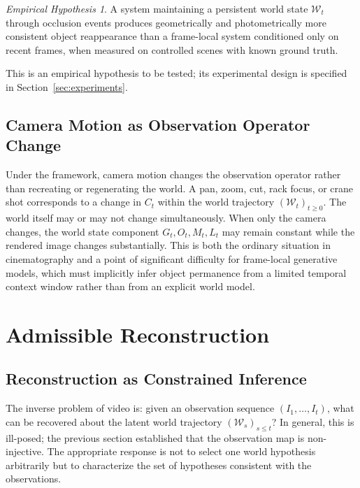 \documentclass[11pt,a4paper]{article}
\theoremstyle{plain}
\theoremstyle{definition}
\theoremstyle{remark}
\newtheorem{hypothesis}[theorem]{Empirical Hypothesis}
\begin{document}
\begin{hypothesis}
\label{hyp:occlusion}
A system maintaining a persistent world state $\mathcal{W}_t$ through occlusion events produces geometrically and photometrically more consistent object reappearance than a frame-local system conditioned only on recent frames, when measured on controlled scenes with known ground truth.
\end{hypothesis}

This is an empirical hypothesis to be tested; its experimental design is specified in Section~\ref{sec:experiments}.

\subsection{Camera Motion as Observation Operator Change}

Under the framework, camera motion changes the observation operator rather than recreating or regenerating the world. A pan, zoom, cut, rack focus, or crane shot corresponds to a change in $C_t$ within the world trajectory $(\mathcal{W}_t)_{t \geq 0}$. The world itself may or may not change simultaneously. When only the camera changes, the world state component $G_t, O_t, M_t, L_t$ may remain constant while the rendered image changes substantially. This is both the ordinary situation in cinematography and a point of significant difficulty for frame-local generative models, which must implicitly infer object permanence from a limited temporal context window rather than from an explicit world model.

\section{Admissible Reconstruction}
\label{sec:admissible}

\subsection{Reconstruction as Constrained Inference}

The inverse problem of video is: given an observation sequence $(I_1, \ldots, I_t)$, what can be recovered about the latent world trajectory $(\mathcal{W}_s)_{s \leq t}$? In general, this is ill-posed; the previous section established that the observation map is non-injective. The appropriate response is not to select one world hypothesis arbitrarily but to characterize the set of hypotheses consistent with the observations.
\end{document}
